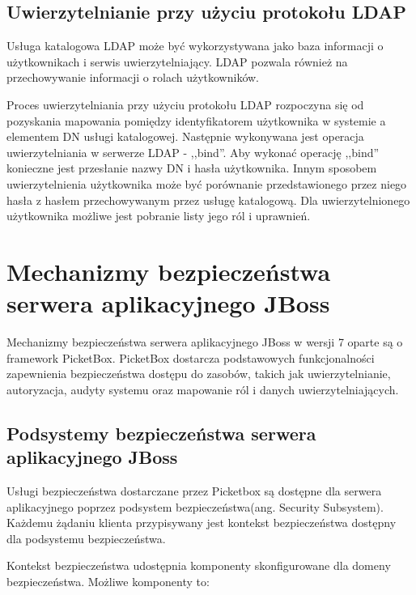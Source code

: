 	\subsection{Uwierzytelnianie przy użyciu protokołu LDAP}

		Usługa katalogowa LDAP może być wykorzystywana jako baza informacji o użytkownikach  i serwis uwierzytelniający. LDAP pozwala również na przechowywanie informacji o rolach użytkowników. 

		Proces uwierzytelniania przy użyciu protokołu LDAP rozpoczyna się od pozyskania mapowania pomiędzy identyfikatorem użytkownika w systemie a elementem DN usługi katalogowej. Następnie wykonywana jest operacja uwierzytelniania w serwerze LDAP - ,,bind''. Aby wykonać operację ,,bind'' konieczne jest przesłanie nazwy DN i hasła użytkownika.  Innym sposobem uwierzytelnienia użytkownika może być porównanie przedstawionego przez niego hasła z hasłem przechowywanym przez usługę katalogową. Dla uwierzytelnionego użytkownika możliwe jest pobranie listy jego ról i uprawnień.


\section{Mechanizmy bezpieczeństwa serwera aplikacyjnego JBoss}
\label{sec:jboss}

	Mechanizmy bezpieczeństwa serwera aplikacyjnego JBoss w wersji 7 oparte są o framework PicketBox. PicketBox dostarcza podstawowych funkcjonalności zapewnienia bezpieczeństwa dostępu do zasobów, takich jak uwierzytelnianie, autoryzacja, audyty systemu oraz mapowanie ról i danych uwierzytelniających. 

	\subsection{Podsystemy bezpieczeństwa serwera aplikacyjnego JBoss}

		Usługi bezpieczeństwa dostarczane przez Picketbox są dostępne dla serwera aplikacyjnego poprzez podsystem bezpieczeństwa(ang. Security Subsystem).  Każdemu żądaniu klienta przypisywany jest kontekst bezpieczeństwa dostępny dla podsystemu bezpieczeństwa\cite{Lofthouse12}. 

		Kontekst bezpieczeństwa udostępnia komponenty skonfigurowane dla domeny bezpieczeństwa. Możliwe komponenty to:

